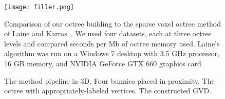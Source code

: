 \documentclass{egpubl}
\begin{document}
\begin{figure}[h]
  \centering
  \texttt{[image: filler.png]}
  \caption{Comparison of our octree building to the sparse voxel octree method of Laine and Karras~.
    We used four datasets, each at three octree levels and compared seconds per Mb of octree memory used.
    Laine's algorithm was run on a Windows 7 desktop with 3.5 GHz processor, 16 GB memory, and NVIDIA GeForce GTX 660 graphics card.
  }
  \label{fig:compare}
\end{figure}

\begin{figure}[h]
  \centering
  \caption{The method pipeline in 3D.
    \protect{} Four bunnies placed in proximity.
    \protect{} The octree with appropriately-labeled vertices.
    \protect{} The constructed GVD.
  }
  \label{fig:bunny}
\end{figure}
\end{document}
